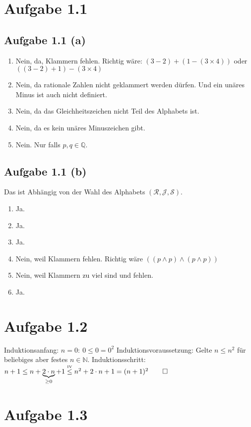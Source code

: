 \documentclass[12pt,a4paper]{article} %
\author{Willi Sontopski}
\newcommand{\Q}{\mathbb{Q}}
\newcommand{\N}{\mathbb{N}}
\newcommand{\myrel}[2]{\mathrel{\stackrel{\makebox[0pt]{\mbox{\normalfont\tiny #1}}}{#2}}}
\begin{document}

\section*{Aufgabe 1.1}
\subsection*{Aufgabe 1.1 (a)}
\begin{enumerate}[{(1)}]
\item  Nein, da, Klammern fehlen. Richtig wäre: $(3-2)+(1-(3\times 4))$ oder $((3-2)+1)-(3\times 4)$
\item Nein, da rationale Zahlen nicht geklammert werden dürfen. Und ein unäres Minus ist auch nicht definiert.
\item Nein, da das Gleichheitszeichen nicht Teil des Alphabets ist.
\item Nein, da es kein unäres Minuszeichen gibt.
\item Nein. Nur falls $p,q\in\Q$.
\end{enumerate}

\subsection*{Aufgabe 1.1 (b)}
Das ist Abhängig von der Wahl des Alphabets $(\mathcal{R},\mathcal{J},\mathcal{S})$.
\begin{enumerate}[{(1)}]
\item Ja.
\item Ja.
\item Ja.
\item Nein, weil Klammern fehlen. Richtig wäre $((p\wedge p)\wedge(p\wedge p))$
\item Nein, weil Klammern zu viel sind und fehlen.
\item Ja.
\end{enumerate}

\section*{Aufgabe 1.2}
Induktionsanfang: $n=0:~0\leq0=0^2$
Induktionsvoraussetzung: Gelte $n\leq n^2$ für beliebiges aber festes $n\in\N$.
Induktionsschritt: 
$n+1\leq
n+\underbrace{2\cdot n}_{\geq0}+1
\myrel{IV}{\leq} n^2+2\cdot n+1=(n+1)^2\qquad\square$

\section*{Aufgabe 1.3}
\end{document}
